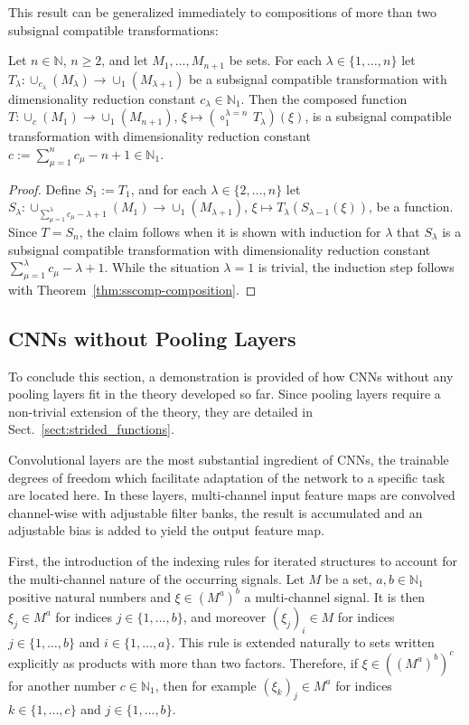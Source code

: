 \documentclass[journal]{IEEEtran}
\newcommand{\N}{\mathbb{N}}
\newcommand{\discint}[2]{\{#1,\dotsc,#2\}}
\newcommand{\inint}[2]{\in\discint{#1}{#2}}
\begin{document}
This result can be generalized immediately to compositions of more than two subsignal compatible transformations:
\begin{corollary}
\label{cor:sscomp-mult-composition}
Let $n\in\N$, $n\geq 2$, and let $M_1,\dotsc,M_{n+1}$ be sets.
For each $\lambda\inint{1}{n}$ let $T_\lambda\colon\cup_{c_\lambda}(M_\lambda)\to\cup_1(M_{\lambda + 1})$ be a subsignal compatible transformation with dimensionality reduction constant $c_\lambda\in\N_1$.
Then the composed function $T\colon\cup_c(M_1)\to\cup_1(M_{n + 1})$, $\xi\mapsto\left(\circ_1^{\lambda = n}\ T_\lambda\right)(\xi)$, is a subsignal compatible transformation with dimensionality reduction constant $c := \sum_{\mu = 1}^n c_\mu - n + 1\in\N_1$.
\end{corollary}
\begin{proof}
Define $S_1 := T_1$, and for each $\lambda\inint{2}{n}$ let $S_\lambda\colon\cup_{\sum_{\mu = 1}^\lambda c_\mu - \lambda + 1}(M_1)\to\cup_1(M_{\lambda + 1})$, $\xi\mapsto T_\lambda(S_{\lambda - 1}(\xi))$, be a function.
Since $T = S_n$, the claim follows when it is shown with induction for $\lambda$ that $S_\lambda$ is a subsignal compatible transformation with dimensionality reduction constant $\sum_{\mu = 1}^\lambda c_\mu - \lambda + 1$.
While the situation $\lambda = 1$ is trivial, the induction step follows with Theorem~\ref{thm:sscomp-composition}.
\end{proof}

\subsection{CNNs without Pooling Layers}
\label{sect:CNNs-wo-pooling}
To conclude this section, a demonstration is provided of how CNNs without any pooling layers fit in the theory developed so far.
Since pooling layers require a non-trivial extension of the theory, they are detailed in Sect.~\ref{sect:strided_functions}.

Convolutional layers are the most substantial ingredient of CNNs, the trainable degrees of freedom which facilitate adaptation of the network to a specific task are located here.
In these layers, multi-channel input feature maps are convolved channel-wise with adjustable filter banks, the result is accumulated and an adjustable bias is added to yield the output feature map.

First, the introduction of the indexing rules for iterated structures to account for the multi-channel nature of the occurring signals.
Let $M$ be a set, $a,b\in\N_1$ positive natural numbers and $\xi\in(M^a)^b$ a multi-channel signal.
It is then $\xi_j\in M^a$ for indices $j\inint{1}{b}$, and moreover $(\xi_j)_i\in M$ for indices $j\inint{1}{b}$ and $i\inint{1}{a}$.
This rule is extended naturally to sets written explicitly as products with more than two factors.
Therefore, if $\xi\in((M^a)^b)^c$ for another number $c\in\N_1$, then for example $(\xi_k)_j\in M^a$ for indices $k\inint{1}{c}$ and $j\inint{1}{b}$.
\end{document}
